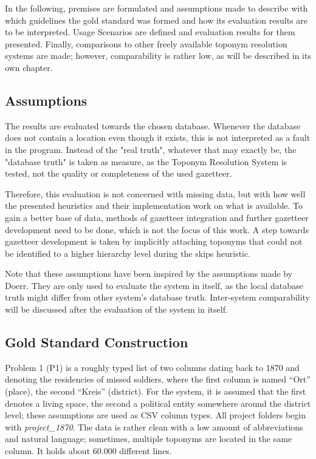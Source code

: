 \documentclass[11pt]{article}
\begin{document}
In the following, premises are formulated and assumptions made to describe with which guidelines the gold standard was formed and how its evaluation results are to be interpreted. Usage Scenarios are defined and evaluation results for them presented. Finally, comparisons to other freely available toponym resolution systems are made;  however, comparability is rather low, as will be described in its own chapter.

\subsection{Assumptions}
The results are evaluated towards the chosen database. Whenever the database does not contain a location even though it exists, this is not interpreted as a fault in the program. Instead of the "real truth", whatever that may exactly be, the "database truth" is taken as measure, as the Toponym Resolution System is tested, not the quality or completeness of the used gazetteer.

Therefore, this evaluation is not concerned with missing data, but with how well the presented heuristics and their implementation work on what is available. To gain a better base of data, methods of gazetteer integration and further gazetteer development need to be done, which is not the focus of this work. A step towards gazetteer development is taken by implicitly attaching toponyms that could not be identified to a higher hierarchy level during the skips heuristic.

Note that these assumptions have been inspired by the assumptions made by Doerr. \cite{doerr2007} They are only used to evaluate the system in itself, as the local database truth might differ from other system's database truth. Inter-system comparability will be discussed after the evaluation of the system in itself.

\subsection{Gold Standard Construction}
Problem 1 (P1) is a roughly typed list of two columns dating back to 1870 and denoting the residencies of missed soldiers, where the first column is named ``Ort'' (place), the second ``Kreis'' (district). For the system, it is assumed that the first denotes a living space, the second a political entity somewhere around the district level; these assumptions are used as CSV column types. All project folders begin with \emph{project\_1870}. The data is rather clean with a low amount of abbreviations and natural language; sometimes, multiple toponyms are located in the same column. It holds about 60.000 different lines.
\end{document}
